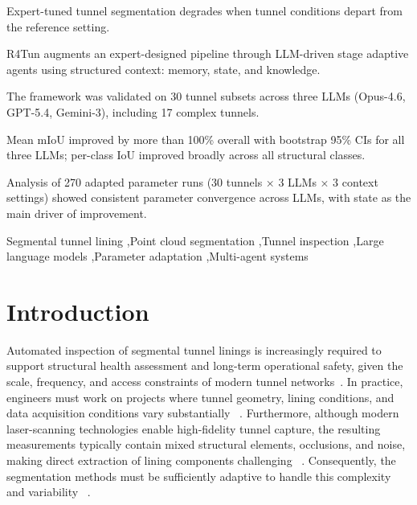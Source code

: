 \documentclass[a4paper,fleqn]{cas-dc}
\begin{document}

\begin{highlights}

\item Expert-tuned tunnel segmentation degrades when tunnel conditions depart from the reference setting.
\item R4Tun augments an expert-designed pipeline through LLM-driven stage adaptive agents using structured context: memory, state, and knowledge.
\item The framework was validated on 30 tunnel subsets across three LLMs (Opus-4.6, GPT-5.4, Gemini-3), including 17 complex tunnels.
\item Mean mIoU improved by more than 100\% overall with bootstrap 95\% CIs for all three LLMs; per-class IoU improved broadly across all structural classes.
\item Analysis of 270 adapted parameter runs (30 tunnels × 3 LLMs × 3 context settings) showed consistent parameter convergence across LLMs, with state as the main driver of improvement.

\end{highlights}


\begin{keywords}
Segmental tunnel lining \sep Point cloud segmentation \sep Tunnel inspection \sep Large language models \sep Parameter adaptation \sep Multi-agent systems
\end{keywords}

\maketitle

\smallskip

\section{Introduction}\label{sec:intro}


Automated inspection of segmental tunnel linings is increasingly required to support structural health assessment and long-term operational safety, given the scale, frequency, and access constraints of modern tunnel networks~\cite{attard2018}. In practice, engineers must work on projects where tunnel geometry, lining conditions, and data acquisition conditions vary substantially ~\cite{weidner2024generalized}. Furthermore, although modern laser-scanning technologies enable high-fidelity tunnel capture, the resulting measurements typically contain mixed structural elements, occlusions, and noise, making direct extraction of lining components challenging ~\cite{huang2021bim,sjolander2023towards}. Consequently, the segmentation methods must be sufficiently adaptive to handle this complexity and variability ~\cite{montero2015, strauss2020sensing, camuffo2022recent}. 
\end{document}
